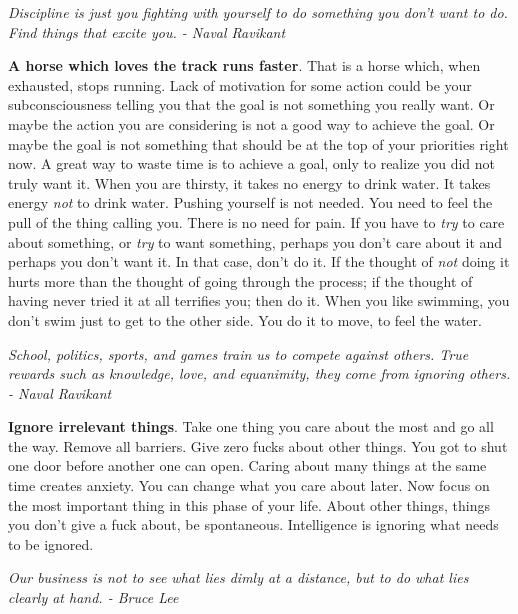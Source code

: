 \documentclass[a4paper,hidelinks]{article}
\begin{document}
\newpage

\begin{center}
\textit{
Discipline is just you fighting with yourself to do something you don't want to do. Find things that excite you. - Naval Ravikant
}
\end{center}

\textbf{A horse which loves the track runs faster}.
That is a horse which, when exhausted, stops running.
Lack of motivation for some action could be your subconsciousness telling you that the goal is not something you really want.
Or maybe the action you are considering is not a good way to achieve the goal.
Or maybe the goal is not something that should be at the top of your priorities right now.
A great way to waste time is to achieve a goal, only to realize you did not truly want it.
When you are thirsty, it takes no energy to drink water.
It takes energy \textit{not} to drink water.
Pushing yourself is not needed.
You need to feel the pull of the thing calling you.
There is no need for pain.
If you have to \textit{try} to care about something, or \textit{try} to want something, perhaps you don't care about it and perhaps you don't want it.
In that case, don't do it.
If the thought of \textit{not} doing it hurts more than the thought of going through the process; if the thought of having never tried it at all terrifies you; then do it.
When you like swimming, you don't swim just to get to the other side.
You do it to move, to feel the water.

\newpage

\begin{center}
\textit{
School, politics, sports, and games train us to compete against others. True rewards such as knowledge, love, and equanimity, they come from ignoring others. - Naval Ravikant
}
\end{center}

\textbf{Ignore irrelevant things}.
Take one thing you care about the most and go all the way.
Remove all barriers.
Give zero fucks about other things.
You got to shut one door before another one can open.
Caring about many things at the same time creates anxiety.
You can change what you care about later.
Now focus on the most important thing in this phase of your life.
About other things, things you don't give a fuck about, be spontaneous.
Intelligence is ignoring what needs to be ignored.

\newpage

\begin{center}
\textit{
Our business is not to see what lies dimly at a distance, but to do what lies clearly at hand. - Bruce Lee
}
\end{center}
\end{document}
